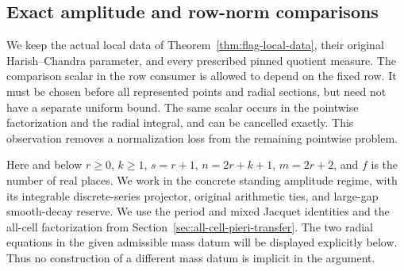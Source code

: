 \subsection{Exact amplitude and row-norm comparisons}
\label{sec:flag-exact-norm-comparison}

We keep the actual local data of
Theorem~\ref{thm:flag-local-data}, their original
Harish--Chandra parameter, and every prescribed pinned
quotient measure. The comparison scalar in the row
consumer is allowed to depend on the fixed row. It must
be chosen before all represented points and radial
sections, but need not have a separate uniform bound.
The same scalar occurs in the pointwise factorization
and the radial integral, and can be cancelled exactly.
This observation removes a normalization loss from the
remaining pointwise problem.\cite{current-construction-record}

Here and below \(r\ge0\), \(k\ge1\), \(s=r+1\),
\(n=2r+k+1\), \(m=2r+2\), and \(f\) is the number of
real places. We work in the concrete standing amplitude
regime, with its integrable discrete-series projector,
original arithmetic ties, and large-gap smooth-decay
reserve. We use the period and mixed Jacquet identities
and the all-cell factorization from
Section~\ref{sec:all-cell-pieri-transfer}. The two radial
equations in the given admissible mass datum will be
displayed explicitly below. Thus no construction of a
different mass datum is implicit in the argument.

